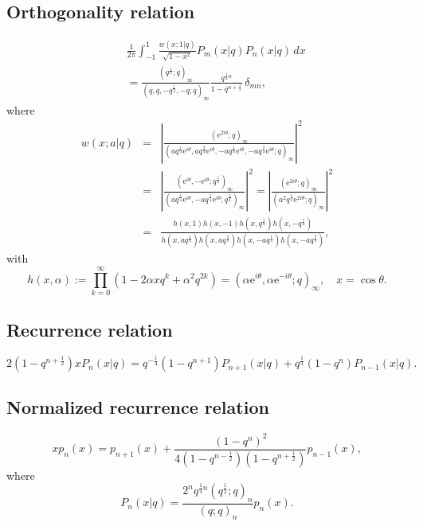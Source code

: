\documentclass[envcountchap,graybox]{svmono}
\newcommand{\e}{\textrm{e}}
\begin{document}
\subsection*{Orthogonality relation}
\begin{eqnarray}
\label{OrtContqLegendre}
& &\frac{1}{2\pi}\int_{-1}^1\frac{w(x;1|q)}{\sqrt{1-x^2}}P_m(x|q)P_n(x|q)\,dx\nonumber\\
& &{}=\frac{(q^{\frac{1}{2}};q)_{\infty}}{(q,q,-q^{\frac{1}{2}},-q;q)_{\infty}}
\frac{q^{\frac{1}{2}n}}{1-q^{n+\frac{1}{2}}}\,\delta_{mn},
\end{eqnarray}
where
\begin{eqnarray*}
w(x;a|q)&=&\left|\frac{(\e^{2i\theta};q)_{\infty}}{(aq^{\frac{1}{4}}\e^{i\theta},
aq^{\frac{3}{4}}\e^{i\theta},-aq^{\frac{1}{4}}\e^{i\theta},
-aq^{\frac{3}{4}}\e^{i\theta};q)_{\infty}}\right|^2\\
&=&\left|\frac{(\e^{i\theta},-\e^{i\theta};q^{\frac{1}{2}})_{\infty}}
{(aq^{\frac{1}{4}}\e^{i\theta},-aq^{\frac{1}{4}}\e^{i\theta};q^{\frac{1}{2}})_{\infty}}\right|^2
=\left|\frac{(\e^{2i\theta};q)_{\infty}}{(a^2q^{\frac{1}{2}}\e^{2i\theta};q)_{\infty}}\right|^2\\
&=&\frac{h(x,1)h(x,-1)h(x,q^{\frac{1}{2}})h(x,-q^{\frac{1}{2}})}
{h(x,aq^{\frac{1}{4}})h(x,aq^{\frac{3}{4}})h(x,-aq^{\frac{1}{4}})h(x,-aq^{\frac{3}{4}})},
\end{eqnarray*}
with
$$h(x,\alpha):=\prod_{k=0}^{\infty}\left(1-2\alpha xq^k+\alpha^2q^{2k}\right)
=\left(\alpha\e^{i\theta},\alpha\e^{-i\theta};q\right)_{\infty},\quad x=\cos\theta.$$

\subsection*{Recurrence relation}
\begin{equation}
\label{RecContqLegendre}
2(1-q^{n+\frac{1}{2}})xP_n(x|q)=q^{-\frac{1}{4}}(1-q^{n+1})P_{n+1}(x|q)
+q^{\frac{1}{4}}(1-q^n)P_{n-1}(x|q).
\end{equation}

\subsection*{Normalized recurrence relation}
\begin{equation}
\label{NormRecContqLegendre}
xp_n(x)=p_{n+1}(x)+\frac{(1-q^n)^2}{4(1-q^{n-\frac{1}{2}})(1-q^{n+\frac{1}{2}})}p_{n-1}(x),
\end{equation}
where
$$P_n(x|q)=\frac{2^nq^{\frac{1}{4}n}(q^{\frac{1}{2}};q)_n}{(q;q)_n}p_n(x).$$
\end{document}
